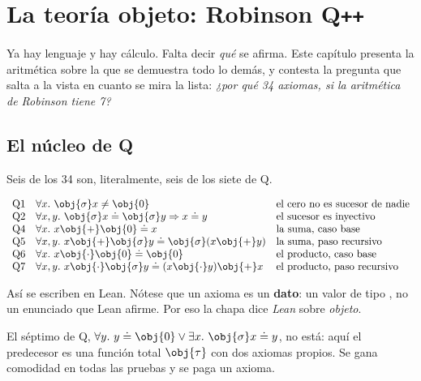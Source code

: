 \chapter{La teoría objeto: Robinson Q\texttt{++}}
\label{cap:qpp}

Ya hay lenguaje y hay cálculo. Falta decir \emph{qué} se afirma. Este capítulo presenta la
aritmética sobre la que se demuestra todo lo demás, y contesta la pregunta que salta a la vista en
cuanto se mira la lista: \emph{¿por qué 34 axiomas, si la aritmética de Robinson tiene 7?}

\section{El núcleo de Q}

Seis de los 34 son, literalmente, seis de los siete de Q.

\begin{matematica}[El núcleo]
\[
\begin{array}{ll}
\text{Q1}\quad \forall x.\ \obj{\sigma} x \neq \obj{0}
  & \text{el cero no es sucesor de nadie}\\
\text{Q2}\quad \forall x,y.\ \obj{\sigma} x \doteq \obj{\sigma} y \Rightarrow x \doteq y
  & \text{el sucesor es inyectivo}\\
\text{Q4}\quad \forall x.\ x \obj{+} \obj{0} \doteq x
  & \text{la suma, caso base}\\
\text{Q5}\quad \forall x,y.\ x \obj{+} \obj{\sigma} y \doteq \obj{\sigma}(x \obj{+} y)
  & \text{la suma, paso recursivo}\\
\text{Q6}\quad \forall x.\ x \obj{\cdot} \obj{0} \doteq \obj{0}
  & \text{el producto, caso base}\\
\text{Q7}\quad \forall x,y.\ x \obj{\cdot} \obj{\sigma} y \doteq (x \obj{\cdot} y) \obj{+} x
  & \text{el producto, paso recursivo}
\end{array}
\]
\end{matematica}

Así se escriben en Lean. Nótese que un axioma es un \textbf{dato}: un valor de tipo
, no un enunciado que Lean afirme. Por eso la chapa dice \emph{Lean} sobre
\emph{objeto}.


El séptimo de Q, \(\forall y.\ y \doteq \obj{0} \vee \exists x.\ \obj{\sigma}x \doteq y\), no está:
aquí el predecesor es una función total \(\obj{\tau}\) con dos axiomas propios. Se gana comodidad en
todas las pruebas y se paga un axioma.

